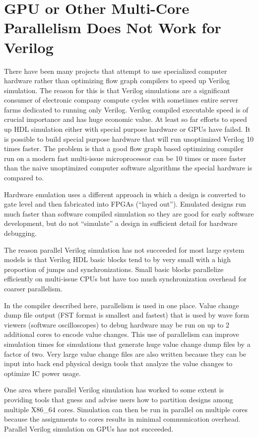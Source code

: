 \documentclass[preprint, authoryear]{sigplanconf}
\begin{document}
\section{GPU or Other Multi-Core Parallelism Does Not Work for Verilog}
\par
There have been many projects that attempt to use specialized computer hardware
rather than optimizing flow graph compilers to speed up Verilog simulation.
The reason for this is that Verilog simulations are a significant consumer of
electronic company compute cycles with sometimes entire server farms
dedicated to running only Verilog.  Verilog compiled executable speed is of
crucial importance and has huge economic value.
At least so far efforts to speed up HDL simulation either with special
purpose hardware or GPUs have failed.  It is possible to build special
purpose hardware that will run unoptimized Verilog 10 times faster.
The problem is that a good flow graph based optimizing compiler run
on a modern fast multi-issue microprocessor can be 10 times or more faster
than the naive unoptimized computer software algorithms the special
hardware is compared to.
\par
Hardware emulation uses a different approach in which a design is converted
to gate level and then fabricated into FPGAs (``layed out''). 
Emulated designs run much faster than software compiled
simulation so they are good for early software
development, but do not ``simulate'' a design in sufficient detail for
hardware debugging.
\par
The reason parallel Verilog simulation has not succeeded for
most large system models is that Verilog HDL basic blocks
tend to by very small with a high proportion of jumps and synchronizations.
Small basic blocks parallelize efficiently on multi-issue CPUs but
have too much synchronization overhead for coarser parallelism.
\par
In the compiler described here, parallelism
is used in one place.  Value change dump file output (FST format is smallest
and fastest) that is used by wave form viewers (software oscilloscopes)
to debug hardware may be run on up to 2 additional cores to encode value
changes.
This use of parallelism can improve simulation times for simulations that
generate huge value change dump files by a factor of two.
Very large value change files are also written because
they can be input into back end physical design tools that analyze the
value changes to optimize IC power usage.
\par
One area where parallel Verilog simulation has worked to some
extent is providing tools that guess and advise users
how to partition designs among multiple X86_64 cores.
Simulation can then
be run in parallel on multiple cores because the assignments to cores results
in minimal communication overhead.
Parallel Verilog simulation on GPUs has not succeeded.
\end{document}
